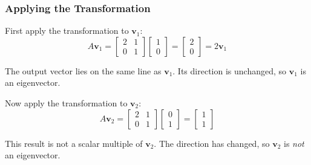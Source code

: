 \subsubsection*{Applying the Transformation}

First apply the transformation to \( \mathbf{v}_1 \):
\[
A \mathbf{v}_1
=
\begin{bmatrix}
2 & 1 \\
0 & 1
\end{bmatrix}
\begin{bmatrix}
1 \\ 0
\end{bmatrix}
=
\begin{bmatrix}
2 \\ 0
\end{bmatrix}
=
2\mathbf{v}_1
\]

The output vector lies on the same line as \( \mathbf{v}_1 \). Its direction is unchanged, so \( \mathbf{v}_1 \) is an eigenvector.

\medskip

Now apply the transformation to \( \mathbf{v}_2 \):
\[
A \mathbf{v}_2
=
\begin{bmatrix}
2 & 1 \\
0 & 1
\end{bmatrix}
\begin{bmatrix}
0 \\ 1
\end{bmatrix}
=
\begin{bmatrix}
1 \\ 1
\end{bmatrix}
\]

This result is not a scalar multiple of \( \mathbf{v}_2 \). The direction has changed, so \( \mathbf{v}_2 \) is \emph{not} an eigenvector.

\medskip

\begin{center}
\end{center}

